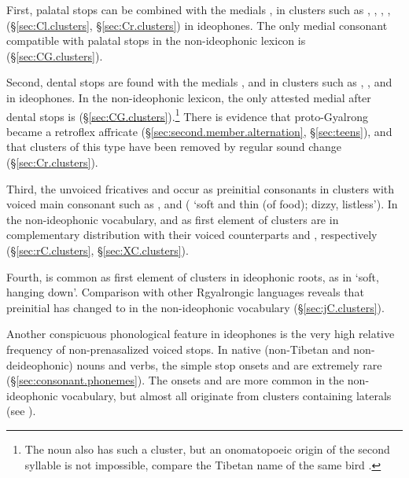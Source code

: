 First, palatal stops can be combined with the medials ,  in clusters such as , , , ,  (§\ref{sec:Cl.clusters}, §\ref{sec:Cr.clusters}) in ideophones. The only medial consonant compatible with palatal stops in the non-ideophonic lexicon is  (§\ref{sec:CG.clusters}).

Second, dental stops are found with the medials ,  and  in clusters such as , ,   and  in ideophones. In the non-ideophonic lexicon, the only attested medial after dental stops is  (§\ref{sec:CG.clusters}).\footnote{The noun  also has such a cluster, but an onomatopoeic origin of the second syllable is not impossible, compare the Tibetan name of the same bird . } There is evidence that proto-Gyalrong  became a retroflex affricate  (§\ref{sec:second.member.alternation}, §\ref{sec:teens}), and that clusters of this type have been removed by regular sound change (§\ref{sec:Cr.clusters}).

Third, the unvoiced fricatives  and  occur as preinitial consonants in clusters with voiced main consonant such as ,  and  ( `soft and thin (of food); dizzy, listless'). In the non-ideophonic vocabulary,  and  as first element of clusters are in complementary distribution with their voiced counterparts  and , respectively (§\ref{sec:rC.clusters}, §\ref{sec:XC.clusters}).

Fourth,  is common as first element of clusters in ideophonic roots, as in   `soft, hanging down'. Comparison with other Rgyalrongic languages reveals that  preinitial has changed to  in the non-ideophonic vocabulary (§\ref{sec:jC.clusters}). 

Another conspicuous phonological feature in ideophones is the very high relative frequency of non-prenasalized voiced stops. In native (non-Tibetan and non-deideophonic) nouns and verbs, the simple stop onsets  and  are extremely rare (§\ref{sec:consonant.phonemes}). The onsets  and  are more common in the non-ideophonic vocabulary, but almost all originate from clusters containing laterals (see \citealt[313--314]{jacques04these}).



